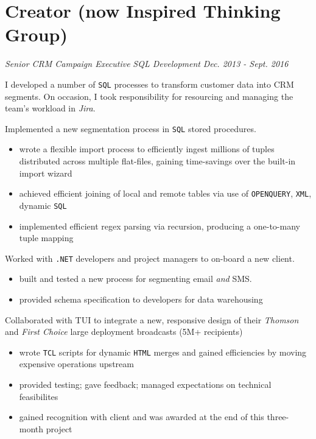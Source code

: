 \documentclass[letterpaper,11pt]{article}
\begin{document}
\section{Creator (now Inspired Thinking Group)}
\textit{Senior CRM Campaign Executive}
\hfill
\textit{SQL Development}
\hfill
\textit{Dec. 2013 - Sept. 2016}
\begin{paragraph}
	I developed a number of \texttt{SQL} processes to transform customer data into CRM segments.  On occasion, I took responsibility for resourcing and managing the team's workload in \textit{Jira}.
\end{paragraph}
\begin{description}[style=multiline,leftmargin=3cm]
	\item[Virgin Media Segmentation \tiny\textnormal{\href{https://adrian.ng/SQL/recursion}{adrian.ng/SQL/recursion}} \textnormal{\href{https://adrian.ng/openquery-xml}{adrian.ng/openquery-xml}}]
	      Implemented a new segmentation process in \texttt{SQL} stored procedures.
	      \begin{itemize}
		      \item wrote a flexible import process to efficiently ingest millions of tuples distributed across multiple flat-files, gaining time-savings over the built-in import wizard
		      \item achieved efficient joining of local and remote tables via use of \texttt{OPENQUERY}, \texttt{XML}, dynamic \texttt{SQL}
		      \item implemented efficient regex parsing via recursion, producing a one-to-many tuple mapping
	      \end{itemize}
	\item[Volkswagen Onboarding]
	      Worked with \texttt{.NET} developers and project managers to on-board a new client.
	      \begin{itemize}
		      \item built and tested a new process for segmenting email \textit{and} SMS.
		      \item provided schema specification to developers for data warehousing
	      \end{itemize}
	\item[TUI Redesign]
	      Collaborated with TUI to integrate a new, responsive design of their \textit{Thomson} and \textit{First Choice} large deployment broadcasts (5M+ recipients)
	      \begin{itemize}
		      \item wrote \texttt{TCL} scripts for dynamic \texttt{HTML} merges and gained efficiencies by moving expensive operations upstream
		      \item provided testing; gave feedback; managed expectations on technical feasibilites
		      \item gained recognition with client and was awarded at the end of this three-month project
	      \end{itemize}
\end{description}
\end{document}
